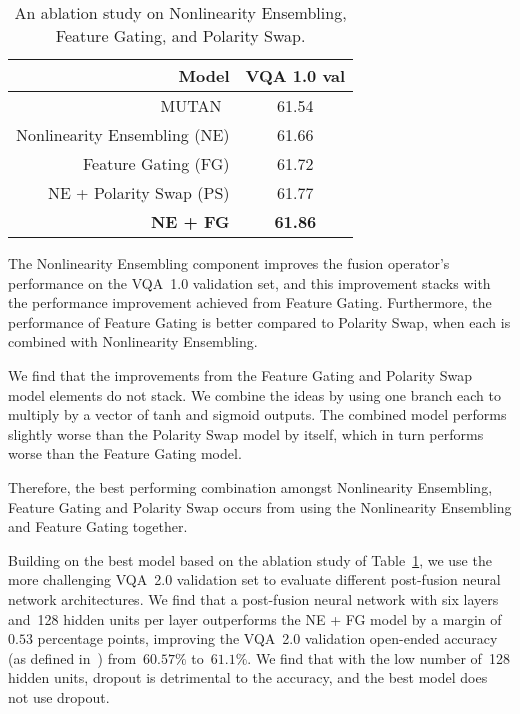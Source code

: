 \begin{table}[!t]
\centering
\caption{An ablation study on Nonlinearity Ensembling, Feature Gating, and
         Polarity Swap.}
\begin{tabular}{rc}
\textbf{Model} & \textbf{VQA 1.0 val} \\
\midrule
MUTAN~\citep{ben2017mutan} & 61.54 \\
\midrule
Nonlinearity Ensembling (NE) & 61.66 \\
Feature Gating (FG) & 61.72 \\
NE + Polarity Swap (PS) & 61.77 \\
\textbf{NE + FG} & \textbf{61.86} \\
\end{tabular}
\label{tab:model-ablation}
\end{table}

The Nonlinearity Ensembling component improves the fusion operator's
performance on the VQA~1.0 validation set, and this improvement stacks with
the performance improvement achieved from Feature Gating. Furthermore, the
performance of Feature Gating is better compared to Polarity Swap, when each
is combined with Nonlinearity Ensembling.

We find that the improvements from the Feature Gating and Polarity Swap model
elements do not stack. We combine the ideas by using one branch each to
multiply by a vector of tanh and sigmoid outputs. The combined model performs
slightly worse than the Polarity Swap model by itself, which in turn performs
worse than the Feature Gating model.

Therefore, the best performing combination amongst Nonlinearity Ensembling,
Feature Gating and Polarity Swap occurs from using the Nonlinearity Ensembling
and Feature Gating together.

Building on the best model based on the ablation study of
Table~\ref{tab:model-ablation}, we use the more challenging VQA~2.0 validation
set to evaluate different post-fusion neural network architectures. We find
that a post-fusion neural network with six layers and~\num{128} hidden units
per layer outperforms the NE + FG model by a margin of~$0.53$ percentage
points, improving the VQA~2.0 validation open-ended accuracy (as defined
in~\citet{goyal2017making}) from~$60.57\%$ to~$61.1\%$. We find that with the
low number of~\num{128} hidden units, dropout is detrimental to the accuracy,
and the best model does not use dropout.

